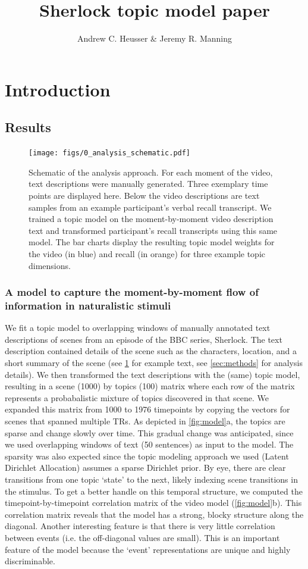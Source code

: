 \documentclass[a4paper,man,natbib,floatsintext]{apa6}
\title{Sherlock topic model paper}
\author{Andrew C. Heusser \& Jeremy R. Manning}
\affiliation{Dartmouth College}
\begin{document}
\maketitle

\section{Introduction}

\subsection{Results}

\begin{figure}[t!]
\centering
\texttt{[image: figs/0\_analysis\_schematic.pdf]}
\caption{\label{fig:schematic}Schematic of the analysis approach. For each moment of the video, text descriptions were manually generated. Three exemplary time points are displayed here.  Below the video descriptions are text samples from an example participant's verbal recall transcript.  We trained a topic model on the moment-by-moment video description text and transformed participant's recall transcripts using this same model. The bar charts display the resulting topic model weights for the video (in blue) and recall (in orange) for three example topic dimensions.}
\end{figure}

\subsubsection{A model to capture the moment-by-moment flow of information in naturalistic stimuli}
We fit a topic model to overlapping windows of manually annotated text descriptions of scenes from an episode of the BBC series, Sherlock. The text description contained details of the scene such as the characters, location, and a short summary of the scene (see \ref{fig:schematic} for example text, see \ref{sec:methods} for analysis details). We then transformed the text descriptions with the (same) topic model, resulting in a scene (1000) by topics (100) matrix where each row of the matrix represents a probabalistic mixture of topics discovered in that scene. We expanded this matrix from 1000 to 1976 timepoints by copying the vectors for scenes that spanned multiple TRs. As depicted in \ref{fig:model}a, the topics are sparse and change slowly over time. This gradual change was anticipated, since we used overlapping windows of text (50 sentences) as input to the model. The sparsity was also expected since the topic modeling approach we used (Latent Dirichlet Allocation) assumes a sparse Dirichlet prior. By eye, there are clear transitions from one topic `state' to the next, likely indexing scene transitions in the stimulus.  To get a better handle on this temporal structure, we computed the timepoint-by-timepoint correlation matrix of the video model (\ref{fig:model}b).  This correlation matrix reveals that the model has a strong, blocky structure along the diagonal.  Another interesting feature is that there is very little correlation between events (i.e. the off-diagonal values are small). This is an important feature of the model because the `event' representations are unique and highly discriminable.
\end{document}
